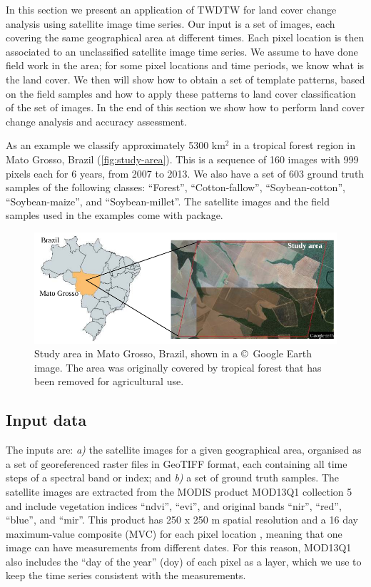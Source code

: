 \documentclass[article,shortnames]{jss}
\begin{document}
In this section we present an application of TWDTW for land cover change
analysis using satellite image time series. Our input is a set of
images, each covering the same geographical area at different times.
Each pixel location is then associated to an unclassified satellite
image time series. We assume to have done field work in the area; for
some pixel locations and time periods, we know what is the land cover.
We then will show how to obtain a set of template patterns, based on the
field samples and how to apply these patterns to land cover
classification of the set of images. In the end of this section we show
how to perform land cover change analysis and accuracy assessment.

As an example we classify approximately 5300 km\(^2\) in a tropical
forest region in Mato Grosso, Brazil (\autoref{fig:study-area}). This is
a sequence of 160 images with 999 pixels each for 6 years, from 2007 to
2013. We also have a set of 603 ground truth samples of the following
classes: ``Forest'', ``Cotton-fallow'', ``Soybean-cotton'',
``Soybean-maize'', and ``Soybean-millet''. The satellite images and the
field samples used in the examples come with  package.

\begin{figure}[!ht]
\begin{center} 
  \includegraphics[width=\textwidth]{./study_area.pdf}
\end{center}
\caption{Study area in Mato Grosso, Brazil, shown in a \copyright\ Google Earth image. The area was originally covered by tropical forest that has been removed for agricultural use.}
\label{fig:study-area}
\end{figure}

\subsection{Input data}\label{input-data-1}

The inputs are: \emph{a)} the satellite images for a given geographical
area, organised as a set of georeferenced raster files in GeoTIFF
format, each containing all time steps of a spectral band or index; and
\emph{b)} a set of ground truth samples. The satellite images are
extracted from the MODIS product MOD13Q1 collection 5
\citep{Friedl:2010} and include vegetation indices ``ndvi'', ``evi'',
and original bands ``nir'', ``red'', ``blue'', and ``mir''. This product
has 250 x 250 m spatial resolution and a 16 day maximum-value composite
(MVC) for each pixel location \citep{Friedl:2010}, meaning that one
image can have measurements from different dates. For this reason,
MOD13Q1 also includes the ``day of the year'' (doy) of each pixel as a
layer, which we use to keep the time series consistent with the
measurements.
\end{document}
